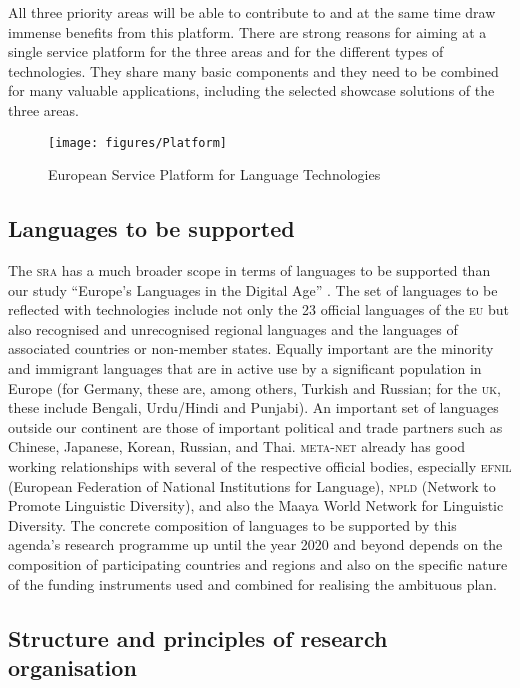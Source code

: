 \documentclass[output=paper]{LSP/langsci}
\begin{document}
All three priority areas will be able to contribute to and at the same
time draw immense benefits from this platform. There are strong
reasons for aiming at a single service platform for the three areas
and for the different types of technologies. They share many basic
components and they need to be combined for many valuable
applications, including the selected showcase solutions of the three
areas.

\begin{figure*}[htb]
  \center
  \texttt{[image: figures/Platform]}
  \caption{European Service Platform for Language Technologies}
  \label{fig:platform-overview}
\end{figure*}

\subsection{Languages to be supported}
\label{sec:languages-to-be-supported}

The \textsc{sra} has a much broader scope in terms of languages to be supported
than our study ``Europe's Languages in the Digital Age''
\citep{LWP2012}. The set of languages to be reflected with
technologies include not only the 23 official languages of the \textsc{eu} but
also recognised and unrecognised regional languages and the languages
of associated countries or non-member states. Equally important are
the minority and immigrant languages that are in active use by a
significant population in Europe (for Germany, these are, among
others, Turkish and Russian; for the \textsc{uk}, these include Bengali,
Urdu/Hindi and Punjabi). An important set of languages outside our
continent are those of important political and trade partners such as Chinese, Japanese, Korean, Russian, and Thai. \textsc{meta-net}
already has good working relationships with several of the respective
official bodies, especially \textsc{efnil} (European Federation of National
Institutions for Language), \textsc{npld} (Network to Promote Linguistic
Diversity), and also the Maaya World Network for Linguistic Diversity.
The concrete composition of languages to be supported by this agenda's
research programme up until the year 2020 and beyond depends on the
composition of participating countries and regions and also on the
specific nature of the funding instruments used and combined for
realising the ambituous plan.

\subsection{Structure and principles of research organisation}
\label{sec:struct-princ-research-org}
\end{document}
